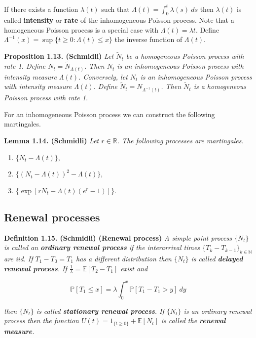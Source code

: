\documentclass[a4paper,10pt,openany]{book}
\providecommand{\tightlist}{%
 \setlength{\itemsep}{0pt}\setlength{\parskip}{0pt}}
\begin{document}
If there exists a function \(\lambda(t)\) such that \(\Lambda(t) = \int_0^t \lambda(s)\ ds\) then \(\lambda(t)\) is called \textbf{intensity} or \textbf{rate} of the inhomogeneous Poisson process. Note that a homogeneous Poisson process is a special case with \(\Lambda(t) = \lambda t\). Define \(\Lambda^{−1}(x) = \sup\{t \ge 0 : \Lambda(t) \le x\}\) the inverse function of \(\Lambda(t)\).

\textbf{Proposition 1.13. (Schmidli)} \emph{Let \(\tilde N_t\) be a homogeneous Poisson process with rate 1. Define \(N_t=\tilde N_{\Lambda (t)}\). Then \(N_t\) is an inhomogeneous Poisson process with intensity measure \(\Lambda(t)\). Conversely, let \(N_t\) is an inhomogeneous Poisson process with intensity measure \(\Lambda(t)\). Define \(\tilde N_t=N_{\Lambda^{-1}(t)}\). Then \(\tilde N_t\) is a homogeneous Poisson process with rate 1.}

For an inhomogeneous Poisson process we can construct the following martingales.

\textbf{Lemma 1.14. (Schmidli)} \emph{Let \(r\in \mathbb R\). The following processes are martingales.}

\begin{enumerate}
\def\labelenumi{\roman{enumi})}
\tightlist
\item
  \(\{N_t-\Lambda(t)\}\),
\item
  \(\{(N_t-\Lambda(t))^2-\Lambda(t)\}\),
\item
  \(\{\exp[rN_t-\Lambda(t)(e^r-1)]\}\).
\end{enumerate}

\hypertarget{renewal-processes}{%
\subsection{Renewal processes}\label{renewal-processes}}

\textbf{Definition 1.15. (Schmidli) (Renewal process)} \emph{A simple point process \(\{N_t\}\) is called an \textbf{ordinary renewal process} if the interarrival times \(\{T_k-T_{k-1}\}_{k\in\mathbb N}\) are iid. If \(T_1-T_0=T_1\) has a different distribution then \(\{N_t\}\) is called \textbf{delayed renewal process}. If \(\frac{1}{\lambda}=\mathbb E[T_2-T_1]\) exist and}

\[
\mathbb P[T_1\le x]=\lambda\int_0^x\mathbb P[T_1-T_1>y]\ dy
\]

\emph{then \(\{N_t\}\) is called \textbf{stationary renewal process}. If \(\{N_t\}\) is an ordinary renewal process then the function \(U(t)=1_{\{t\ge 0\}}+\mathbb E[N_t]\) is called the \textbf{renewal measure}.}
\end{document}

